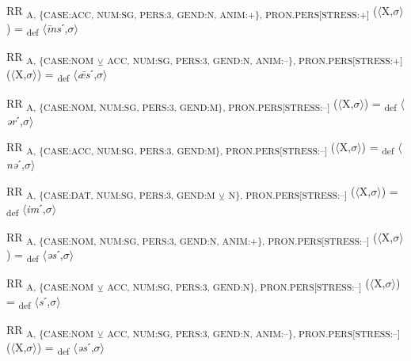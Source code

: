 {\begin{exe}
 RR \textsubscript{A, \{CASE:ACC, NUM:SG, PERS:3, GEND:N, ANIM:+\}, PRON.PERS[STRESS:+]} ($\langle$X,$\sigma $$\rangle$) = \textsubscript{def} $\langle$\textit{\=ins}ˊ,$\sigma $$\rangle$
\end{exe}

\begin{exe}
 RR \textsubscript{A, \{CASE:NOM} \textsubscript{${\veebar}$}\textsubscript{ ACC, NUM:SG, PERS:3, GEND:N, ANIM:–\}, PRON.PERS[STRESS:+]} ($\langle$X,$\sigma $$\rangle$) = \textsubscript{def} $\langle$\textit{ǣs}ˊ,$\sigma $$\rangle$
\end{exe}

\begin{exe}
 RR \textsubscript{A, \{CASE:NOM, NUM:SG, PERS:3, GEND:M\}, PRON.PERS[STRESS:–]} ($\langle$X,$\sigma $$\rangle$) = \textsubscript{def} $\langle$\textit{ər}ˊ,$\sigma $$\rangle$
\end{exe}

\begin{exe}
 RR \textsubscript{A, \{CASE:ACC, NUM:SG, PERS:3, GEND:M\}, PRON.PERS[STRESS:–]} ($\langle$X,$\sigma $$\rangle$) = \textsubscript{def} $\langle$\textit{nə}ˊ,$\sigma $$\rangle$
\end{exe}

\begin{exe}
 RR \textsubscript{A, \{CASE:DAT, NUM:SG, PERS:3, GEND:M} \textsubscript{${\veebar}$}\textsubscript{ N\}, PRON.PERS[STRESS:–]} ($\langle$X,$\sigma $$\rangle$) = \textsubscript{def} $\langle$\textit{im}ˊ,$\sigma $$\rangle$
\end{exe}

\begin{exe}
 RR \textsubscript{A, \{CASE:NOM, NUM:SG, PERS:3, GEND:N, ANIM:+\}, PRON.PERS[STRESS:–]} ($\langle$X,$\sigma $$\rangle$) = \textsubscript{def} $\langle$\textit{əs}ˊ,$\sigma $$\rangle$
\end{exe}

\begin{exe}
 RR \textsubscript{A, \{CASE:NOM} \textsubscript{${\veebar}$}\textsubscript{ ACC, NUM:SG, PERS:3, GEND:N\}, PRON.PERS[STRESS:–]} ($\langle$X,$\sigma $$\rangle$) = \textsubscript{def} $\langle$\textit{s}ˊ,$\sigma $$\rangle$
\end{exe}

\begin{exe}
 RR \textsubscript{A, \{CASE:NOM} \textsubscript{${\veebar}$}\textsubscript{ ACC, NUM:SG, PERS:3, GEND:N, ANIM:–\}, PRON.PERS[STRESS:–]} ($\langle$X,$\sigma $$\rangle$) = \textsubscript{def} $\langle$\textit{əs}ˊ,$\sigma $$\rangle$
\end{exe}

}
